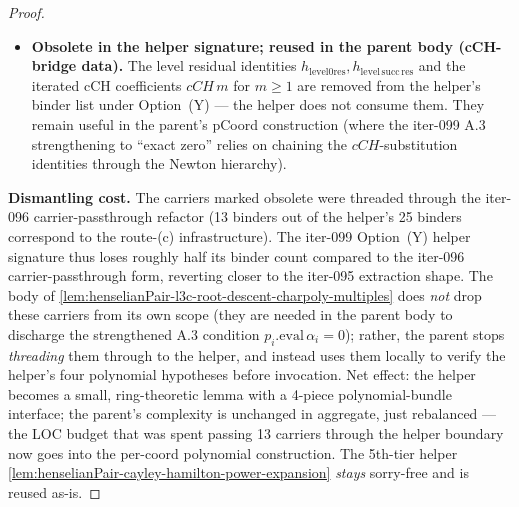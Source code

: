 \begin{proof}
\begin{itemize}
(monic, eval-$\alpha$-zero, eval-$0$-zero, deriv-unit). The
telescoping carriers are therefore \emph{dead weight in the
helper signature}. \emph{Iter-099 nuance}: the parent still needs
some of this infrastructure to discharge the strengthened
$p_i.\mathrm{eval}\,\alpha_i = 0$ \emph{exact} condition
introduced by Option~(Y) — specifically, the telescoping identity
relating $\alpha_i$ to the Newton iterates $\alpha^{(\mathrm{Hi})}$
is what lets the parent assemble a polynomial that vanishes
exactly at $\alpha_i$. So the carriers persist as \emph{parent
in-body data}, not as helper binders.
\item \textbf{Obsolete in the helper signature; reused in the
parent body (cCH-bridge data).}
The level residual identities $h_{\mathrm{level} 0\mathrm{res}},
h_{\mathrm{level\,succ\,res}}$ and the iterated cCH coefficients
$cCH\,m$ for $m \ge 1$ are removed from the helper's binder list
under Option~(Y) — the helper does not consume them. They remain
useful in the parent's pCoord construction (where the iter-099
A.3 strengthening to ``exact zero'' relies on chaining the
$cCH$-substitution identities through the Newton hierarchy).
\end{itemize}
\textbf{Dismantling cost.} The carriers marked obsolete were
threaded through the iter-096 carrier-passthrough refactor
(13 binders out of the helper's 25 binders correspond to the
route-(c) infrastructure). The iter-099 Option~(Y) helper
signature thus loses roughly half its binder count compared to
the iter-096 carrier-passthrough form, reverting closer to the
iter-095 extraction shape. The body of
\cref{lem:henselianPair-l3c-root-descent-charpoly-multiples}
does \emph{not} drop these carriers from its own scope (they are
needed in the parent body to discharge the strengthened
A.3 condition $p_i.\mathrm{eval}\,\alpha_i = 0$); rather, the
parent stops \emph{threading} them through to the helper, and
instead uses them locally to verify the helper's four polynomial
hypotheses before invocation. Net effect: the helper becomes a
small, ring-theoretic lemma with a 4-piece polynomial-bundle
interface; the parent's complexity is unchanged in aggregate,
just rebalanced — the LOC budget that was spent passing 13
carriers through the helper boundary now goes into the per-coord
polynomial construction. The 5th-tier helper
\cref{lem:henselianPair-cayley-hamilton-power-expansion}
\emph{stays} sorry-free and is reused as-is.


\end{proof}
